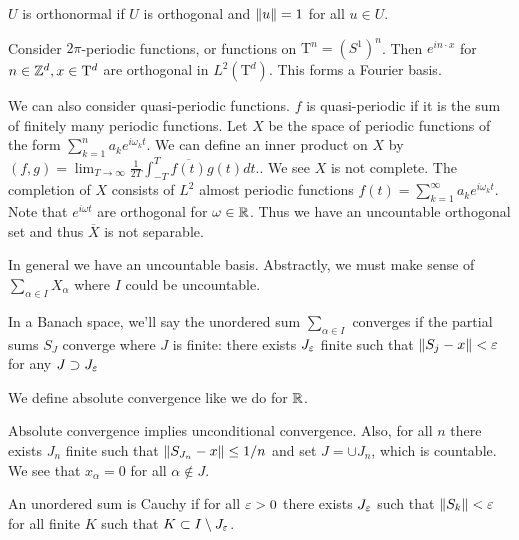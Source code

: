 \documentclass[10pt, twoside]{article}
\begin{document}
    \begin{defn} $U$ is orthonormal if $U$ is orthogonal
    and $\lVert u\rVert = 1$ for all $u \in U$.  \end{defn}
    
    \begin{exm} Consider $2 \pi$-periodic functions, or functions on
    $\mathrm{T}^n = (S^1)^n$. Then $e^{in \cdot x}$ for $n \in \mathbb{Z}^d, x \in
\mathrm{T}^d$ are orthogonal in $L^2(\mathrm{T}^d)$. This forms a Fourier
basis.  \end{exm}

    \begin{exm} We can also consider quasi-periodic functions. $f$ is
        quasi-periodic if it is the sum of finitely many periodic functions.
        Let $X$ be the space of periodic functions of the form $\sum_{k=1}^n
        a_k e^{i\omega_kt}$. We can define an inner product on $X$ by $(f,g) =
        \lim_{T \to \infty} \frac{1}{2T} \int_{-T}^T \overline{f(t)} g(t) dt.$.
        We see $X$ is not complete. The completion of $X$ consists of $L^2$
        almost periodic functions $f(t) = \sum_{k=1}^{\infty} a_ke^{i\omega_k
        t}$. Note that $e^{i\omega t}$ are orthogonal for $\omega \in \mathbb{R}$. Thus
        we have an uncountable orthogonal set and thus $\overline{X}$ is not
        separable.  \end{exm}

    In general we have an uncountable basis. Abstractly, we must make sense of
    $\sum_{\alpha \in I} X_{\alpha}$ where $I$ could be uncountable. 

    \begin{defn} In a Banach space, we'll say the
        unordered sum $\sum_{\alpha \in I}$ converges if the partial sums $S_J$
        converge where $J$ is finite: there exists $J_{\varepsilon}$ finite such that
        $\lVert S_j - x\rVert < \varepsilon$ for any $J \supset J_{\varepsilon}$ \end{defn}

    We define absolute convergence like we do for $\mathbb{R}$.

    \begin{lem} Absolute convergence implies unconditional convergence. Also,
        for all $n$ there exists $J_n$ finite such that $\lVert S_{J_n} - x\rVert
        \leq 1/n$ and set $J = \cup J_n$, which is countable. We see that
        $x_{\alpha} = 0$ for all $\alpha \notin J$.  \end{lem}

    \begin{defn} An unordered sum is Cauchy if for all $\varepsilon > 0$ there exists
    $J_{\varepsilon}$ such that $\lVert S_k\rVert < \varepsilon$ for all finite $K$ such that $K
\subset I \setminus J_{\varepsilon}$.  \end{defn}
\end{document}
